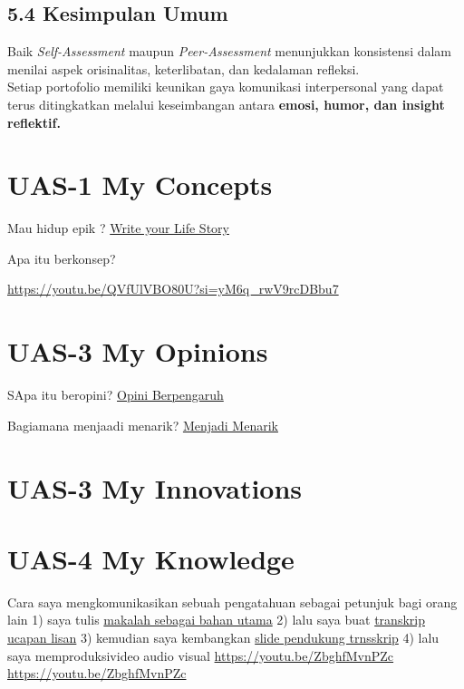\documentclass[
  letterpaper,
  DIV=11,
  numbers=noendperiod]{scrreprt}
\begin{document}
\section{5.4 Kesimpulan Umum}\label{kesimpulan-umum}

Baik \emph{Self-Assessment} maupun \emph{Peer-Assessment} menunjukkan
konsistensi dalam menilai aspek orisinalitas, keterlibatan, dan
kedalaman refleksi.\\
Setiap portofolio memiliki keunikan gaya komunikasi interpersonal yang
dapat terus ditingkatkan melalui keseimbangan antara \textbf{emosi,
humor, dan insight reflektif.}


\chapter{UAS-1 My Concepts}\label{uas-1-my-concepts}

Mau hidup epik ? \href{lifestory.pdf}{Write your Life Story}

Apa itu berkonsep?

\url{https://youtu.be/QVfUlVBO80U?si=yM6q_rwV9rcDBbu7}


\chapter{UAS-3 My Opinions}\label{uas-3-my-opinions}

SApa itu beropini? \href{BM\%20Opini.mp4}{Opini Berpengaruh}

Bagiamana menjaadi menarik? \href{./Interesting.mp4}{Menjadi Menarik}


\chapter{UAS-3 My Innovations}\label{uas-3-my-innovations}


\chapter{UAS-4 My Knowledge}\label{uas-4-my-knowledge}

Cara saya mengkomunikasikan sebuah pengatahuan sebagai petunjuk bagi
orang lain 1) saya tulis
\href{Rekomendasi\%20Presentasi\%20Efektif(Contoh\%20Makalah).pdf}{makalah
sebagai bahan utama} 2) lalu saya buat
\href{Contoh\%20Transkrip\%20Presentasi.pdf}{transkrip ucapan lisan} 3)
kemudian saya kembangkan
\href{Rekomendasi\%20Presentasi\%20(Contoh\%20Slides).pdf}{slide
pendukung trnsskrip} 4) lalu saya memproduksivideo audio visual
\url{https://youtu.be/ZbghfMvnPZc} \url{https://youtu.be/ZbghfMvnPZc}
\end{document}
